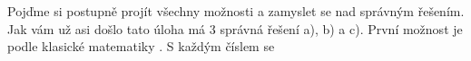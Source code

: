 \documentclass{../../../../style/mkimain}
\begin{document}
\noindent{}
\klein

Pojďme si postupně projít všechny možnosti a zamyslet se nad správným řešením. Jak vám už asi došlo
tato úloha má 3 správná řešení a), b) a c). První možnost je podle klasické matematiky . S každým číslem se 
\end{document}
